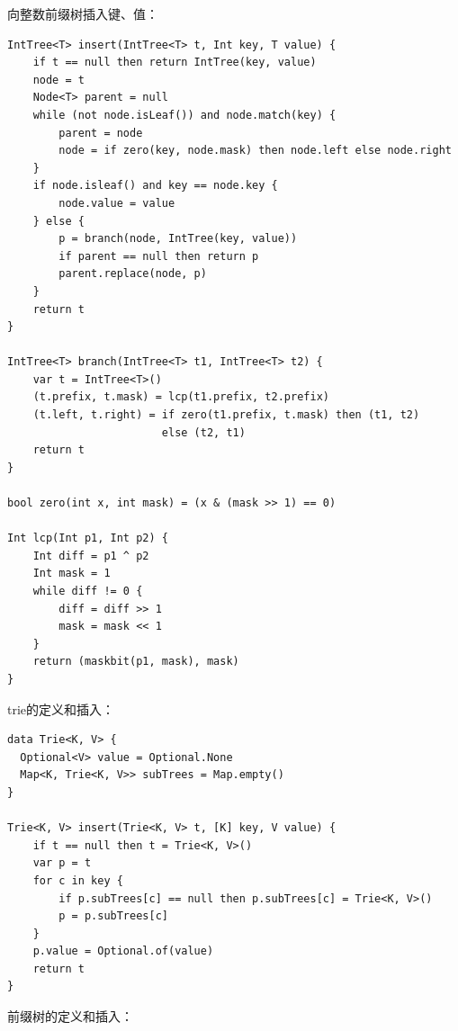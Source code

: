 \documentclass[b5paper]{ctexart}
\begin{document}
向整数前缀树插入键、值：

\begin{lstlisting}[language = Bourbaki]
IntTree<T> insert(IntTree<T> t, Int key, T value) {
    if t == null then return IntTree(key, value)
    node = t
    Node<T> parent = null
    while (not node.isLeaf()) and node.match(key) {
        parent = node
        node = if zero(key, node.mask) then node.left else node.right
    }
    if node.isleaf() and key == node.key {
        node.value = value
    } else {
        p = branch(node, IntTree(key, value))
        if parent == null then return p
        parent.replace(node, p)
    }
    return t
}

IntTree<T> branch(IntTree<T> t1, IntTree<T> t2) {
    var t = IntTree<T>()
    (t.prefix, t.mask) = lcp(t1.prefix, t2.prefix)
    (t.left, t.right) = if zero(t1.prefix, t.mask) then (t1, t2)
                        else (t2, t1)
    return t
}

bool zero(int x, int mask) = (x & (mask >> 1) == 0)

Int lcp(Int p1, Int p2) {
    Int diff = p1 ^ p2
    Int mask = 1
    while diff != 0 {
        diff = diff >> 1
        mask = mask << 1
    }
    return (maskbit(p1, mask), mask)
}
\end{lstlisting}


trie的定义和插入：

\begin{lstlisting}[language = Bourbaki]
data Trie<K, V> {
  Optional<V> value = Optional.None
  Map<K, Trie<K, V>> subTrees = Map.empty()
}

Trie<K, V> insert(Trie<K, V> t, [K] key, V value) {
    if t == null then t = Trie<K, V>()
    var p = t
    for c in key {
        if p.subTrees[c] == null then p.subTrees[c] = Trie<K, V>()
        p = p.subTrees[c]
    }
    p.value = Optional.of(value)
    return t
}
\end{lstlisting}

前缀树的定义和插入：
\end{document}
